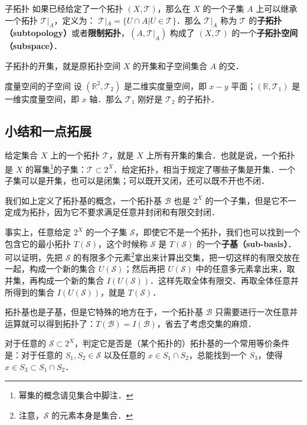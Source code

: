 \begin{definition}{子拓扑}\label{Topol_def3}
如果已经给定了一个拓扑 $(X, \mathcal{T})$，那么在 $X$ 的一个子集 $A$ 上可以继承一个拓扑 $\mathcal{T}|_A$，定义为：
$\mathcal{T}|_A=\{U\cap A|U\in \mathcal{T}\}$．那么 $\mathcal{T}|_A$ 称为 $\mathcal{T}$ 的\textbf{子拓扑（subtopology）}或者\textbf{限制拓扑}，$(A, \mathcal{T}|_A)$ 构成了 $(X, \mathcal{T})$ 的一个\textbf{子拓扑空间（subspace）}．
\end{definition}

子拓扑的开集，就是原拓扑空间 $X$ 的开集和子空间集合 $A$ 的交．

\begin{example}{度量空间的子空间}
设 $(\mathbb{R}^2, \mathcal{T}_2)$ 是二维实度量空间，即 $x-y$ 平面；$(\mathbb{R}, \mathcal{T}_1)$ 是一维实度量空间，即 $x$ 轴．那么 $\mathcal{T}_1$ 刚好是 $\mathcal{T}_2$ 的子拓扑．
\end{example}

\subsection{小结和一点拓展}

给定集合 $X$ 上的一个拓扑 $\mathcal{T}$，就是 $X$ 上所有开集的集合．也就是说，一个拓扑是 $X$ 的幂集\footnote{幂集的概念请见集合中脚注．}的子集：$\mathcal{T}\subset 2^X$．给定拓扑，相当于规定了哪些子集是开集．一个子集可以是开集，也可以是闭集；可以既开又闭，还可以既不开也不闭．

我们如上定义了拓扑基的概念，一个拓扑基 $\mathcal{B}$ 也是 $2^X$ 的一个子集，但是它不一定成为拓扑，因为它不要求满足任意并封闭和有限交封闭．

事实上，任意给定 $2^X$ 的一个子集 $\mathcal{S}$，即使它不是一个拓扑，我们也可以找到一个包含它的最小拓扑 $T(\mathcal{S})$，这个时候称 $\mathcal{S}$ 是 $T(\mathcal{S})$ 的一个\textbf{子基（sub-basis）}．可以证明，先把 $\mathcal{S}$ 的有限多个元素\footnote{注意，$\mathcal{S}$ 的元素本身是集合．}拿出来计算出交集，把一切这样的有限交放在一起，构成一个新的集合 $U(\mathcal{S})$；然后再把 $U(\mathcal{S})$ 中的任意多元素拿出来，取并集，再构成一个新的集合 $I(U(\mathcal{S}))$．这样先取全体有限交、再取全体任意并所得到的集合 $I(U(\mathcal{S}))$，就是 $T(\mathcal{S})$．

拓扑基也是子基，但是它特殊的地方在于，一个拓扑基 $\mathcal{B}$ 只需要进行一次任意并运算就可以得到拓扑了：$T(\mathcal{B})=I(\mathcal{B})$，省去了考虑交集的麻烦．

对于任意的 $\mathcal{S}\subset2^X$，判定它是否是（某个拓扑的）拓扑基的一个常用等价条件是：对于任意的 $S_1, S_2\in \mathcal{S}$ 以及任意的 $x\in S_1\cap S_2$，总能找到一个 $S_3$，使得 $x\in S_3\subset S_1\cap S_2$．
